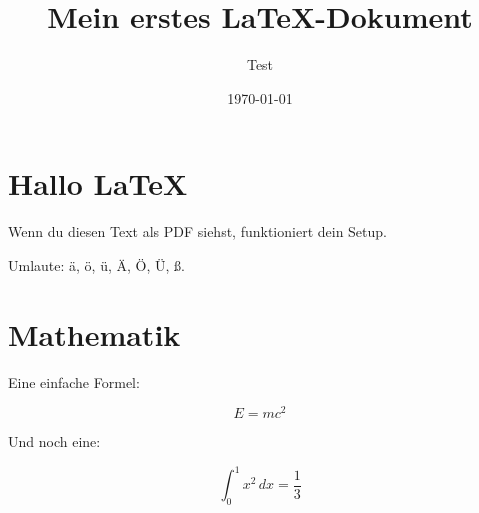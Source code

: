 \documentclass[a4paper,12pt]{article}
\title{Mein erstes LaTeX-Dokument}
\author{Test}
\date{\today}
\begin{document}
\maketitle

\section{Hallo LaTeX}

Wenn du diesen Text als PDF siehst, funktioniert dein Setup.

Umlaute: ä, ö, ü, Ä, Ö, Ü, ß.

\section{Mathematik}

Eine einfache Formel:

\[
E = mc^2
\]

Und noch eine:

\[
\int_0^1 x^2 \, dx = \frac{1}{3}
\]
\end{document}
